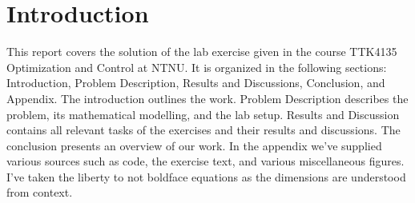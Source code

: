 \section{Introduction}\label{sec:intro}
This report covers the solution of the lab exercise given in the course TTK4135 Optimization and Control at NTNU. It is organized in the following sections: Introduction, Problem Description, Results and Discussions, Conclusion, and Appendix. The introduction outlines the work. Problem Description describes the problem, its mathematical modelling, and the lab setup. Results and Discussion contains all relevant tasks of the exercises and their results and discussions. The conclusion presents an overview of our work. In the appendix we've supplied various sources such as code, the exercise text, and various miscellaneous figures. I've taken the liberty to not boldface equations as the dimensions are understood from context.



